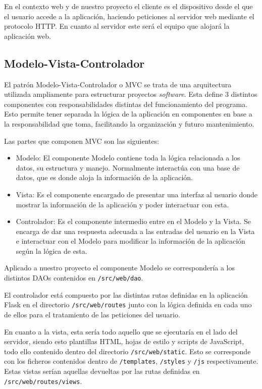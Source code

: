 
En el contexto web y de nuestro proyecto el cliente es el dispositivo desde el que el usuario accede a la aplicación, haciendo peticiones al servidor web mediante el protocolo HTTP. En cuanto al servidor este será el equipo que alojará la aplicación web.
\subsection{Modelo-Vista-Controlador}

El patrón Modelo-Vista-Controlador o MVC se trata de una arquitectura utilizada ampliamente para estructurar proyectos \textit{software}. Esta define 3 distintos componentes con responsabilidades distintas del funcionamiento del programa. Esto permite tener separada la lógica de la aplicación en componentes en base a la responsabilidad que toma, facilitando la organización y futuro mantenimiento.


Las partes que componen MVC son las siguientes:
\begin{itemize}
	\item Modelo: El componente Modelo contiene toda la lógica relacionada a los datos, su estructura y manejo. Normalmente interactúa con una base de datos, que es donde aloja la información de la aplicación.
	\item Vista: Es el componente encargado de presentar una interfaz al usuario donde mostrar la información de la aplicación y poder interactuar con esta.
	\item Controlador: Es el componente intermedio entre en el Modelo y la Vista. Se encarga de dar una respuesta adecuada a las entradas del usuario en la Vista e interactuar con el Modelo para modificar la información de la aplicación según la lógica de esta. 
\end{itemize}

Aplicado a nuestro proyecto el componente Modelo se correspondería a los distintos DAOs contenidos en \texttt{/src/web/dao}.

El controlador está compuesto por las distintas rutas definidas en la aplicación Flask en el directorio \texttt{/src/web/routes} junto con la lógica definida en cada uno de ellos para el tratamiento de las peticiones del usuario.

En cuanto a la vista, esta sería todo aquello que se ejecutaría en el lado del servidor, siendo esto plantillas HTML, hojas de estilo y scripts de JavaScript, todo ello contenido dentro del directorio \texttt{/src/web/static}. Esto se corresponde con los ficheros contenidos dentro de \texttt{/templates}, \texttt{/styles} y \texttt{/js} respectivamente. Estas vistas serían aquellas devueltas por las rutas definidas en \texttt{/src/web/routes/views}.